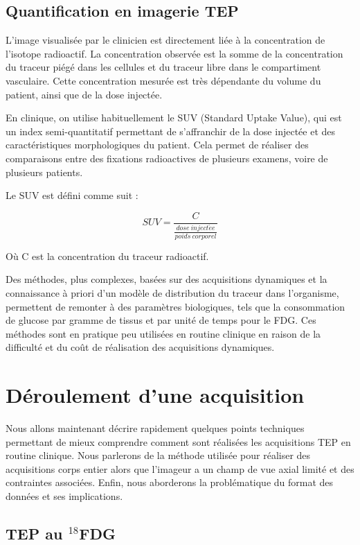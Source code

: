 \section{Quantification en imagerie TEP}

L'image visualisée par le clinicien est directement liée à  la concentration de l'isotope radioactif. La concentration observée est la somme de la concentration du traceur piégé dans les cellules et du traceur libre dans le compartiment vasculaire. Cette concentration mesurée est très dépendante du volume du patient, ainsi que de la dose injectée.

En clinique, on utilise habituellement le SUV (Standard Uptake Value), qui est un index semi-quantitatif permettant de s'affranchir de la dose injectée et des caractéristiques morphologiques du patient. Cela permet de réaliser des comparaisons entre des fixations radioactives de plusieurs examens, voire de plusieurs patients.

Le SUV est défini comme suit :

\begin{equation}
SUV=\frac{C}{ \frac{dose~inject\acute{e}e}{poids~corporel} }
\end{equation}

Où C est la concentration du traceur radioactif.

Des méthodes, plus complexes, basées sur des acquisitions dynamiques et la connaissance à priori d'un modèle de distribution du traceur dans l'organisme, permettent de remonter à des paramètres biologiques, tels que la consommation de glucose par gramme de tissus et par unité de temps pour le FDG. Ces méthodes sont en pratique peu utilisées en routine clinique en raison de la difficulté et du coût de réalisation des acquisitions dynamiques.

\chapter{Déroulement d'une acquisition}


Nous allons maintenant décrire rapidement quelques points techniques permettant de mieux comprendre comment sont réalisées les acquisitions TEP en routine clinique. Nous parlerons de la méthode utilisée pour réaliser des acquisitions corps entier alors que l'imageur a un champ de vue axial limité et des contraintes associées. Enfin, nous aborderons la problématique du format des données et ses implications.

\section{TEP au $^{18}$FDG}


